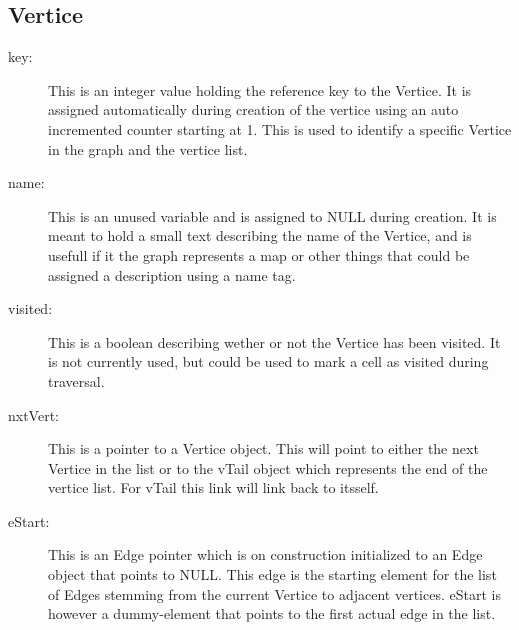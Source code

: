 \subsection{Vertice}
\begin{description}
\item [key:]			This is an integer value holding the reference key to the
	Vertice. It is assigned automatically during creation of the vertice using an
	auto incremented counter starting at 1.  This is used to identify a specific
	Vertice in the graph and the vertice list.
\item [name:]			This is an unused variable and is assigned to NULL during
	creation. It is meant to hold a small text describing the name of the Vertice,
	and is usefull if it the graph represents a map or other things that could be
	assigned a description using a name tag.
\item [visited:]	This is a boolean describing wether or not the Vertice has
	been visited. It is not currently used, but could be used to mark a cell as
	visited during traversal.
\item [nxtVert:]	This is a pointer to a Vertice object. This will point to
	either the next Vertice in the list or to the vTail object which represents
	the end of the vertice list.  For vTail this link will link back to itsself.
\item [eStart:]		This is an Edge pointer which is on construction initialized
	to an Edge object that points to NULL.  This edge is the starting element for
	the list of Edges stemming from the current Vertice to adjacent vertices.
	eStart is however a dummy-element that points to the first actual edge in the
	list.
\end{description}
